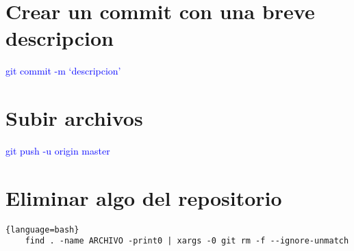 \documentclass[spanish]{article}
\begin{document}
\section{Crear un commit con una breve descripcion}

\begin{center}
    \Large{\textcolor{blue}{ git commit -m `descripcion'}}
\end{center}

\section{Subir archivos}

\begin{center}
    \Large{\textcolor{blue}{ git push -u origin master}}
\end{center}

\section{Eliminar algo del repositorio}


\begin{lstlisting}{language=bash}
    find . -name ARCHIVO -print0 | xargs -0 git rm -f --ignore-unmatch
\end{lstlisting}

 
\end{document}

